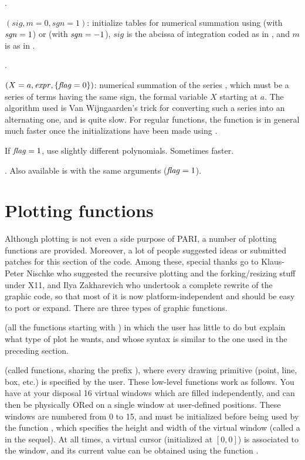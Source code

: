 .

$(sig,{m=0},{sgn=1})$: initialize tables for numerical
summation using  (with $\hbox{\it sgn\/}=1$) or  (with
$\hbox{\it sgn\/}=-1$), $sig$ is the abcissa of integration coded as in ,
and $m$ is as in .

.

$(X=a,\hbox{\it expr\/},\{\hbox{\it f\kern0pt lag\/}=0\})$: numerical summation of the
series , which must be a series of terms having the same sign,
the formal
variable $X$ starting at $a$. The algorithm used is Van Wijngaarden's trick
for converting such a series into an alternating one, and is quite slow. For
regular functions, the function  is in general much faster once the
initializations have been made using .

If $\hbox{\it f\kern0pt lag\/}=1$, use slightly different polynomials. Sometimes faster.

. Also
available is  with the same arguments ($\hbox{\it f\kern0pt lag\/} = 1$).

\section{Plotting functions}

  Although plotting is not even a side purpose of PARI, a number of plotting
functions are provided. Moreover, a lot of people suggested ideas or submitted
patches for this section of the code. Among these, special thanks go to
Klaus-Peter Nischke who suggested the recursive plotting and the
forking/resizing stuff under X11, and Ilya Zakharevich who undertook a
complete rewrite of the graphic code, so that most of it is now
platform-independent and should be easy to port or expand. There are three
types of graphic functions.

 (all the functions starting with ) in which the user has little to
do but explain what type of plot he wants, and whose syntax is similar to the
one used in the preceding section.

 (called  functions,
sharing the prefix ), where every drawing primitive (point, line,
box, etc.) is specified by the user. These low-level functions work as
follows. You have at your disposal 16 virtual windows which are filled
independently, and can then be physically ORed on a single window at
user-defined positions. These windows are numbered from 0 to 15, and must be
initialized before being used by the function , which specifies
the height and width of the virtual window (called a  in the
sequel). At all times, a virtual cursor (initialized at $[0,0]$) is associated
to the window, and its current value can be obtained using the function
.

